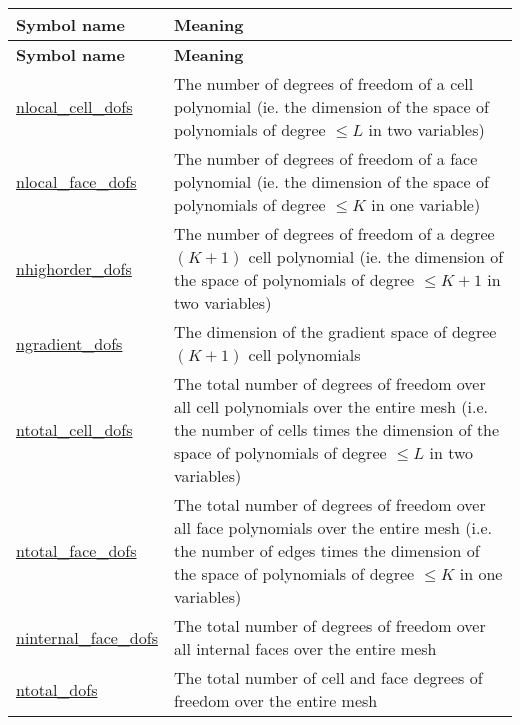 \tabulinesep=1mm
\begin{longtabu} spread 0pt [c]{*{2}{|X[-1]}|}
\hline
\rowcolor{\tableheadbgcolor}\textbf{ Symbol name }&\textbf{ Meaning  }\\
\endfirsthead
\hline
\endfoot
\hline
\rowcolor{\tableheadbgcolor}\textbf{ Symbol name }&\textbf{ Meaning  }\\
\endhead
\hyperlink{group__HybridCore_ga6faceb46cc896cd6d82a821828518730}{nlocal\+\_\+cell\+\_\+dofs} &The number of degrees of freedom of a cell polynomial (ie. the dimension of the space of polynomials of degree $\le L$ in two variables) \\
\hyperlink{group__HybridCore_ga6a45e5ff09d21b18874e1446cd9de9bc}{nlocal\+\_\+face\+\_\+dofs} &The number of degrees of freedom of a face polynomial (ie. the dimension of the space of polynomials of degree $\le K$ in one variable) \\
\hyperlink{group__HybridCore_gaa7f78bc066429a18ad596d45a79d37bc}{nhighorder\+\_\+dofs} &The number of degrees of freedom of a degree $(K+1)$ cell polynomial (ie. the dimension of the space of polynomials of degree $\le K+1$ in two variables) \\
\hyperlink{group__HybridCore_ga6f7c5ef5103bed8a3e0ecc18d592b1f9}{ngradient\+\_\+dofs} &The dimension of the gradient space of degree $(K+1)$ cell polynomials \\
\hyperlink{group__HybridCore_gaf97e3efcc37ac51074c7136af3ca517b}{ntotal\+\_\+cell\+\_\+dofs} &The total number of degrees of freedom over all cell polynomials over the entire mesh (i.\+e. the number of cells times the dimension of the space of polynomials of degree $\le L$ in two variables) \\
\hyperlink{group__HybridCore_ga49a703b6786215e5acf8bb59ecdbc9ea}{ntotal\+\_\+face\+\_\+dofs} &The total number of degrees of freedom over all face polynomials over the entire mesh (i.\+e. the number of edges times the dimension of the space of polynomials of degree $\le K$ in one variables) \\
\hyperlink{group__HybridCore_gae6e771ab58f248db8f051d47de982cf5}{ninternal\+\_\+face\+\_\+dofs} &The total number of degrees of freedom over all internal faces over the entire mesh \\
\hyperlink{group__HybridCore_ga728e5b5aa3675a64e7dbc593ed9761f8}{ntotal\+\_\+dofs} &The total number of cell and face degrees of freedom over the entire mesh \\
\end{longtabu}
